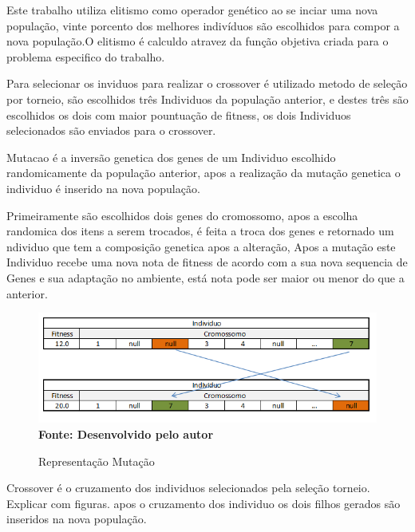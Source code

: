 \documentclass{abntpuc}
\begin{document}

Este trabalho utiliza elitismo como operador genético ao se inciar uma nova população, vinte porcento dos melhores indivíduos são escolhidos para compor a nova população.O elitismo é calculdo atravez da função objetiva criada para o problema especifico do trabalho.\par

Para selecionar os inviduos para realizar o crossover é utilizado metodo de seleção por torneio, são escolhidos três Individuos da população anterior, e destes três são escolhidos os dois com maior pountuação de fitness, os dois Individuos selecionados são enviados para o crossover.\par

Mutacao é a inversão genetica dos genes de um Individuo escolhido randomicamente da população anterior, apos a realização da mutação genetica o individuo é inserido na nova população.\par

Primeiramente são escolhidos dois genes do cromossomo, apos a escolha randomica dos itens a serem trocados, é feita a troca dos genes e retornado um ndividuo que tem a composição genetica apos a alteração, Apos a mutação este Individuo recebe uma nova nota de fitness de acordo com a sua nova sequencia de Genes e sua adaptação no ambiente, está nota pode ser maior ou menor do que a anterior.\par

\begin{figure}[!htb]
\caption[Representação Mutação]{Representação Mutação}
\label{fig:figura8}
\centering
\includegraphics[scale=0.7]{imagens/representacaoMutacao.png}
\\ \textbf{\footnotesize Fonte: Desenvolvido pelo autor}
\end{figure}

Crossover é o cruzamento dos individuos selecionados pela seleção torneio. Explicar com figuras. apos o cruzamento dos individuo os dois filhos gerados são inseridos na nova população.\par
\end{document}

